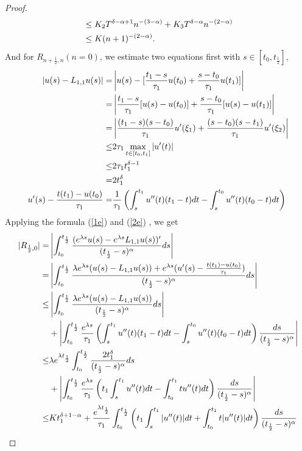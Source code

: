 \documentclass[10pt, reqno]{amsart}
\theoremstyle{remark}
\theoremstyle{definition}
\numberwithin{table}{section}
\begin{document}
\begin{proof}
\begin{align}
&\leq K_2T^{\delta-\alpha+1}n^{-(3-\alpha)}+K_3T^{\delta-\alpha}n^{-(2-\alpha)}\notag\\
&\leq K (n+1)^{-(2-\alpha)}. 
\end{align}
And for $R_{{n+\frac{1}{2}}, n}(n=0)$, we estimate two equations first with $s \in [t_0, t_\frac{1}{2}]$, 
\begin{align}
    |u(s)-L_{1, 1}u(s)|=&\left| u(s)-[\frac{t_1-s}{\tau_1}u(t_0)+\frac{s-t_0}{\tau_1}u(t_1)]\right|\notag\\
    =&\left|\frac{t_1-s}{\tau_1}[u(s)-u(t_0)]+\frac{s-t_0}{\tau_1}[u(s)-u(t_1)]\right|\notag\\
    =&\left|\frac{(t_1-s)(s-t_0)}{\tau_1}u'(\xi_1)+\frac{(s-t_0)(s-t_1)}{\tau_1}u'(\xi_2)\right|\notag\\
    \leq&2\tau_1\max_{t\in[t_0, t_1]}|u'(t)|\notag\\
    \leq &2\tau_1t_1^{\delta-1}\notag\\
    =&2t_1^{\delta}\label{1e}\\
    u'(s)-\frac{t(t_1)-u(t_0)}{\tau_1}=&\frac{1}{\tau_1}\left(\int_s^{t_{1}}u''(t)(t_{1}-t)dt-\int_s^{t_{0}}u''(t)(t_{0}-t)dt\right)\label{2e}
\end{align}
Applying the formula (\ref{1e}) and (\ref{2e}) , we get
\begin{align}
|R_{{\frac{1}{2}}, 0}|=& \left|\int_{t_0}^{t_{\frac{1}{2}}}\frac{(e^{\lambda s}u(s)-e^{\lambda s}L_{1, 1}u(s))'}{(t_{\frac{1}{2}}-s)^\alpha}ds\right|\notag\\
=&\left|\int_{t_0}^{t_{\frac{1}{2}}}\frac{\lambda e^{\lambda s}(u(s)-L_{1, 1}u(s))+e^{\lambda s}(u'(s)-\frac{t(t_1)-u(t_0)}{\tau_1})}{(t_{\frac{1}{2}}-s)^\alpha}ds\right| \notag\\
\leq &\left|\int_{t_0}^{t_{\frac{1}{2}}}\frac{\lambda e^{\lambda s}(u(s)-L_{1, 1}u(s))}{(t_{\frac{1}{2}}-s)^\alpha}ds\right| \notag\\
&+\left|\int_{t_0}^{t_{\frac{1}{2}}}\frac{e^{\lambda s}}{\tau_1}\left(\int_s^{t_{1}}u''(t)(t_{1}-t)dt-\int_s^{t_{0}}u''(t)(t_{0}-t)dt\right)\frac{ds}{(t_{\frac{1}{2}}-s)^\alpha}\right|\notag\\
\leq &\lambda e^{\lambda t_{\frac{1}{2}}}\int_{t_0}^{t_{\frac{1}{2}}}\frac{2t_1^\delta}{(t_{\frac{1}{2}}-s)^\alpha}ds \notag\\
&+\left|\int_{t_0}^{t_{\frac{1}{2}}}\frac{e^{\lambda s}}{\tau_1}\left(t_1\int_s^{t_{1}}u''(t)dt-\int_{t_0}^{t_{1}}tu''(t)dt\right)\frac{ds}{(t_{\frac{1}{2}}-s)^\alpha}\right|\notag\\
\leq& Kt_1^{\delta+1-\alpha}+\frac{e^{\lambda t_\frac{1}{2}}}{\tau_1}\int_{t_0}^{t_{\frac{1}{2}}}\left(t_1\int_s^{t_{1}}|u''(t)|dt+\int_{t_0}^{t_{1}}t|u''(t)|dt\right)\frac{ds}{(t_{\frac{1}{2}}-s)^\alpha}\notag\\

\end{align}
\end{proof}
\end{document}
